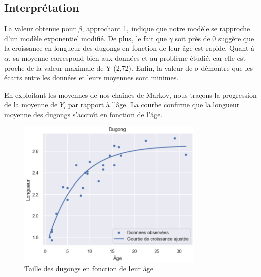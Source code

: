 \documentclass{rapportECN}
\begin{document}
\subsection*{Interprétation}

La valeur obtenue pour $\beta$, approchant 1, indique que notre modèle se rapproche d'un modèle exponentiel modifié. De plus, le fait que $\gamma$ soit près de 0 suggère que la croissance en longueur des dugongs en fonction de leur âge est rapide. Quant à $\alpha$, sa moyenne correspond bien aux données et au problème étudié, car elle est proche de la valeur maximale de Y (2,72). Enfin, la valeur de $\sigma$ démontre que les écarts entre les données et leurs moyennes sont minimes. \newline

En exploitant les moyennes de nos chaînes de Markov, nous traçons la progression de la moyenne de $Y_i$ par rapport à l'âge. La courbe confirme que la longueur moyenne des dugongs s'accroît en fonction de l'âge.
\begin{figure}[H]
\centering
\includegraphics[width=0.8\textwidth]{logos/ev2.png}
\caption{Taille des dugongs en fonction de leur âge}
    
\end{figure}
\end{document}
